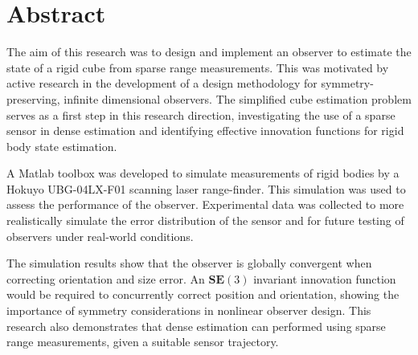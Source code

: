 \chapter*{Abstract}

The aim of this research was to design and implement an observer to estimate the state of a rigid cube from sparse range measurements. This was motivated by active research in the development of a design methodology for symmetry-preserving, infinite dimensional observers. The simplified cube estimation problem serves as a first step in this research direction, investigating the use of a sparse sensor in dense estimation and identifying effective innovation functions for rigid body state estimation. 

A Matlab toolbox was developed to simulate measurements of rigid bodies by a Hokuyo UBG-04LX-F01 scanning laser range-finder. This simulation was used to assess the performance of the observer. Experimental data was collected to more realistically simulate the error distribution of the sensor and for future testing of observers under real-world conditions. 

The simulation results show that the observer is globally convergent when correcting orientation and size error. An $\mathbf{SE}(3)$ invariant innovation function would be required to concurrently correct position and orientation, showing the importance of symmetry considerations in nonlinear observer design. This research also demonstrates that dense estimation can performed using sparse range measurements, given a suitable sensor trajectory. 


